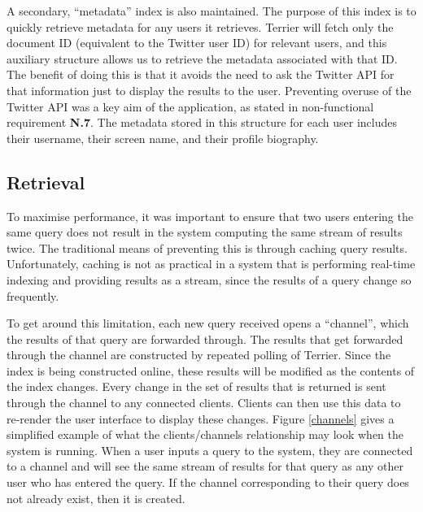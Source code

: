\documentclass{l4proj}
\begin{document}
        A secondary, ``metadata'' index is also maintained. The purpose of this index is to quickly retrieve metadata for any users it retrieves. Terrier will fetch only the document ID (equivalent to the Twitter user ID) for relevant users, and this auxiliary structure allows us to retrieve the metadata associated with that ID. The benefit of doing this is that it avoids the need to ask the Twitter API for that information just to display the results to the user. Preventing overuse of the Twitter API was a key aim of the application, as stated in non-functional requirement \textbf{N.7}. The metadata stored in this structure for each user includes their username, their screen name, and their profile biography.
        
        \subsection{Retrieval}

        To maximise performance, it was important to ensure that two users entering the same query does not result in the system computing the same stream of results twice. The traditional means of preventing this is through caching query results. Unfortunately, caching is not as practical in a system that is performing real-time indexing and providing results as a stream, since the results of a query change so frequently.
        
        To get around this limitation, each new query received opens a ``channel'', which the results of that query are forwarded through. The results that get forwarded through the channel are constructed by repeated polling of Terrier. Since the index is being constructed online, these results will be modified as the contents of the index changes. Every change in the set of results that is returned is sent through the channel to any connected clients. Clients can then use this data to re-render the user interface to display these changes. Figure \ref{channels} gives a simplified example of what the clients/channels relationship may look when the system is running. When a user inputs a query to the system, they are connected to a channel and will see the same stream of results for that query as any other user who has entered the query. If the channel corresponding to their query does not already exist, then it is created.
        
\end{document}
